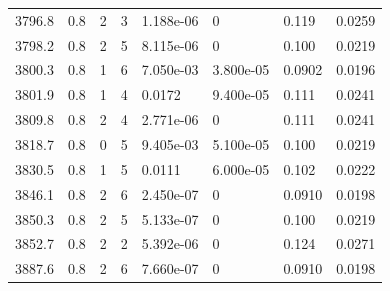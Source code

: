 \documentclass[preview]{standalone}
\begin{document}
{{{{{{{{{\begin{tabular}{L{1.2cm}C{1.2cm} C{0.3cm}C{0.5cm} C{1.4cm}C{1.4cm} C{1.4cm}C{1.4cm}}
  3796.8  &   0.8  & 2     &  3 &  1.188e-06  & 0  & 0.119 &  0.0259   \\ 
  3798.2  &   0.8  & 2     &  5 &  8.115e-06  & 0  & 0.100 &  0.0219   \\ 
  3800.3  &   0.8  & 1     &  6 &  7.050e-03  & 3.800e-05  & 0.0902 &  0.0196   \\ 
  3801.9  &   0.8  & 1     &  4 &  0.0172  & 9.400e-05  & 0.111 &  0.0241   \\ 
  3809.8  &   0.8  & 2     &  4 &  2.771e-06  & 0  & 0.111 &  0.0241   \\ 
  3818.7  &   0.8  & 0     &  5 &  9.405e-03  & 5.100e-05  & 0.100 &  0.0219   \\ 
  3830.5  &   0.8  & 1     &  5 &  0.0111  & 6.000e-05  & 0.102 &  0.0222   \\ 
  3846.1  &   0.8  & 2     &  6 &  2.450e-07  & 0  & 0.0910 &  0.0198   \\ 
  3850.3  &   0.8  & 2     &  5 &  5.133e-07  & 0  & 0.100 &  0.0219   \\ 
  3852.7  &   0.8  & 2     &  2 &  5.392e-06  & 0  & 0.124 &  0.0271   \\ 
  3887.6  &   0.8  & 2     &  6 &  7.660e-07  & 0  & 0.0910 &  0.0198   \\ 
\hline 
\end{tabular} 

}}}}}}}}}
\end{document}
